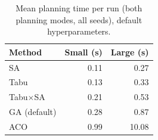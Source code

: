 \begin{table}[h]
\centering
\begin{tabular}{lrr}
\toprule
Method & Small (s) & Large (s) \\
\midrule
SA & 0.11 & 0.27 \\
Tabu & 0.13 & 0.33 \\
Tabu$\times$SA & 0.21 & 0.53 \\
GA (default) & 0.28 & 0.87 \\
ACO & 0.99 & 10.08 \\
\bottomrule
\end{tabular}
\caption{Mean planning time per run (both planning modes, all seeds), default hyperparameters.}
\label{tab:time}
\end{table}
